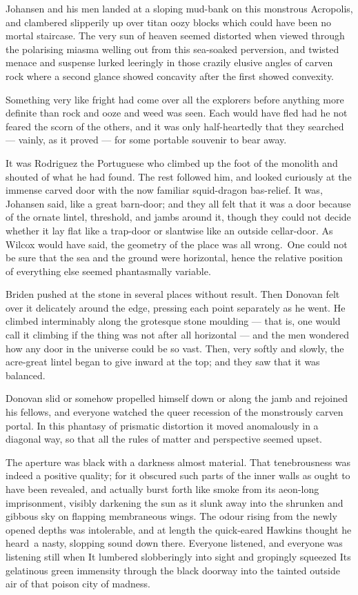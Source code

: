 Johansen and his men landed at a sloping mud-bank on this monstrous
Acropolis, and clambered slipperily up over titan oozy blocks which
could have been no mortal staircase. The very sun of heaven seemed
distorted when viewed through the polarising miasma welling out from
this sea-soaked perversion, and twisted menace and suspense lurked
leeringly in those crazily elusive angles of carven rock where a second
glance showed concavity after the first showed convexity.

Something very like fright had come over all the explorers before
anything more definite than rock and ooze and weed was seen. Each would
have fled had he not feared the scorn of the others, and it was only
half-heartedly that they searched --- vainly, as it proved --- for some
portable souvenir to bear away.

It was Rodriguez the Portuguese who climbed up the foot of the monolith
and shouted of what he had found. The rest followed him, and looked
curiously at the immense carved door with the now familiar squid-dragon
bas-relief. It was, Johansen said, like a great barn-door; and they all
felt that it was a door because of the ornate lintel, threshold, and
jambs around it, though they could not decide whether it lay flat like a
trap-door or slantwise like an outside cellar-door. As Wilcox would have
said, the geometry of the place was all wrong.\est\ One could not be sure
that the sea and the ground were horizontal, hence the relative position
of everything else seemed phantasmally variable.

Briden pushed at the stone in several places without result. Then
Donovan felt over it delicately around the edge, pressing each point
separately as he went. He climbed interminably along the grotesque stone
moulding --- that is, one would call it climbing if the thing was not
after all horizontal --- and the men wondered how any door in the universe
could be so vast. Then, very softly and slowly, the acre-great lintel
began to give inward at the top; and they saw that it was balanced.

Donovan slid or somehow propelled himself down or along the jamb and
rejoined his fellows, and everyone watched the queer recession of the
monstrously carven portal. In this phantasy of prismatic distortion it
moved anomalously in a diagonal way, so that all the rules of matter and
perspective seemed upset.

The aperture was black with a darkness almost material. That
tenebrousness was indeed a positive quality; for it obscured such parts
of the inner walls as ought to have been revealed, and actually burst
forth like smoke from its aeon-long imprisonment, visibly darkening the
sun as it slunk away into the shrunken and gibbous sky on flapping
membraneous wings. The odour rising from the newly opened depths was
intolerable, and at length the quick-eared Hawkins thought he heard\est\ a
nasty, slopping sound down there. Everyone listened, and everyone was
listening still when It lumbered slobberingly into sight and gropingly
squeezed Its gelatinous green immensity through the black doorway into
the tainted outside air of that poison city of madness.

